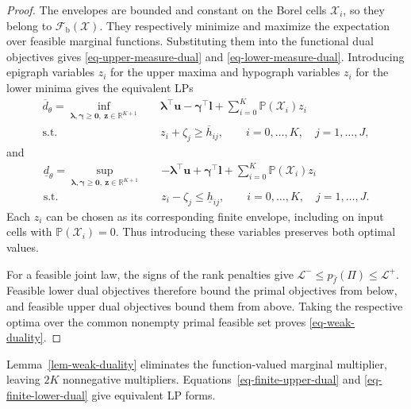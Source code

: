 \documentclass[review,11pt,3p,authoryear,nopreprintline]{elsarticle}
\begin{document}
\begin{proof}
  The envelopes are bounded and constant on the Borel cells $\mathcal X_i$, so they belong to $\mathcal F_{\mathrm b}(\mathcal X)$. They respectively minimize and maximize the expectation over feasible marginal functions. Substituting them into the functional dual objectives gives \eqref{eq-upper-measure-dual} and \eqref{eq-lower-measure-dual}. Introducing epigraph variables $z_i$ for the upper maxima and hypograph variables $z_i$ for the lower minima gives the equivalent LPs
  \begin{equation}
    \begin{aligned}
      \overline d_\theta
      =\inf_{\bm\lambda,\bm\gamma\ge\bm0,\ \bm z\in\mathbb R^{K+1}}\quad&
        \bm\lambda^\top\bm u-\bm\gamma^\top\bm l+\sum_{i=0}^{K}\mathbb P(\mathcal X_i) z_i\\
      \text{s.t.}\quad&z_i+\zeta_j\ge\overline h_{ij},
        \qquad i=0,\ldots,K,\quad j=1,\ldots,J,
    \end{aligned}
    \label{eq-finite-upper-dual}
  \end{equation}
  and
  \begin{equation}
    \begin{aligned}
      \underline d_\theta
      =\sup_{\bm\lambda,\bm\gamma\ge\bm0,\ \bm z\in\mathbb R^{K+1}}\quad&
        -\bm\lambda^\top\bm u+\bm\gamma^\top\bm l+\sum_{i=0}^{K}\mathbb P(\mathcal X_i) z_i\\
      \text{s.t.}\quad&z_i-\zeta_j\le\underline h_{ij},
        \qquad i=0,\ldots,K,\quad j=1,\ldots,J.
    \end{aligned}
    \label{eq-finite-lower-dual}
  \end{equation}
  Each $z_i$ can be chosen as its corresponding finite envelope, including on input cells with $\mathbb P(\mathcal X_i)=0$. Thus introducing these variables preserves both optimal values.

  For a feasible joint law, the signs of the rank penalties give $\mathcal L^-\le p_{\hat f}(\Pi)\le\mathcal L^+$. Feasible lower dual objectives therefore bound the primal objectives from below, and feasible upper dual objectives bound them from above. Taking the respective optima over the common nonempty primal feasible set proves \eqref{eq-weak-duality}.
\end{proof}

Lemma~\ref{lem-weak-duality} eliminates the function-valued marginal multiplier, leaving $2K$ nonnegative multipliers. Equations~\eqref{eq-finite-upper-dual} and \eqref{eq-finite-lower-dual} give equivalent LP forms.
\end{document}
